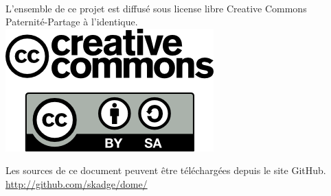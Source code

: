 \documentclass[a4paper,12pt]{book}
\begin{document}
\clearpage
\thispagestyle{empty}
~
\vfill
\begin{center}
	L'ensemble de ce projet est diffusé sous license libre Creative Commons Paternité-Partage à l'identique.\\
	\vspace{2cm}
	\includegraphics[scale=0.5]{logo_cc.png}
\end{center}

\vfill

\begin{center}
	Les sources de ce document peuvent être téléchargées depuis le site GitHub.
	\url{http://github.com/skadge/dome/}
\end{center}

\vfill
\end{document}
